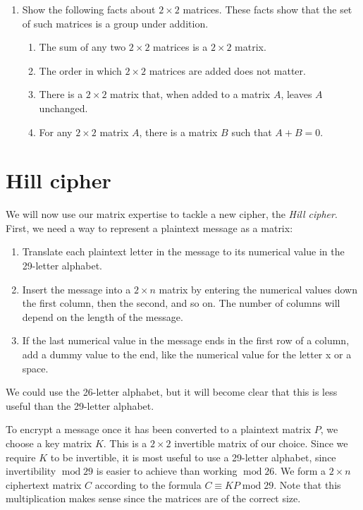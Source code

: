 \documentclass{book}
\theoremstyle{plain}
\theoremstyle{definition}
\renewcommand{\mod}{\operatorname{mod}}
\renewcommand{\mod}{\operatorname{mod}}
\begin{document}
\begin{enumerate}
\item Show the following facts about $2 \times 2$ matrices. These facts show that the set of such matrices is a group under addition.
\begin{enumerate}
\item The sum of any two $2 \times 2$ matrices is a $2 \times 2$ matrix.
\item The order in which $2 \times 2$ matrices are added does not matter.
\item There is a $2 \times 2$ matrix that, when added to a matrix $A$, leaves $A$ unchanged.
\item For any $2 \times 2$ matrix $A$, there is a matrix $B$ such that $A + B = 0$.
\end{enumerate}
\end{enumerate}

\chapter{Hill cipher}
We will now use our matrix expertise to tackle a new cipher, the {\it Hill cipher}. First, we need a way to represent a plaintext message as a matrix:
\begin{enumerate}
\item Translate each plaintext letter in the message to its numerical value in the 29-letter alphabet.
\item Insert the message into a $2 \times n$ matrix by entering the numerical values down the first column, then the second, and so on. The number of columns will depend on the length of the message.
\item If the last numerical value in the message ends in the first row of a column, add a dummy value to the end, like the numerical value for the letter x or a space.
\end{enumerate}
We could use the 26-letter alphabet, but it will become clear that this is less useful than the 29-letter alphabet.

To encrypt a message once it has been converted to a plaintext matrix $P$, we choose a key matrix $K$. This is a $2 \times 2$ invertible matrix of our choice. Since we require $K$ to be invertible, it is most useful to use a 29-letter alphabet, since invertibility $\mod 29$ is easier to achieve than working $\mod 26$. We form a $2 \times n$ ciphertext matrix $C$ according to the formula $C \equiv KP \mod 29$. Note that this multiplication makes sense since the matrices are of the correct size.
\end{document}

